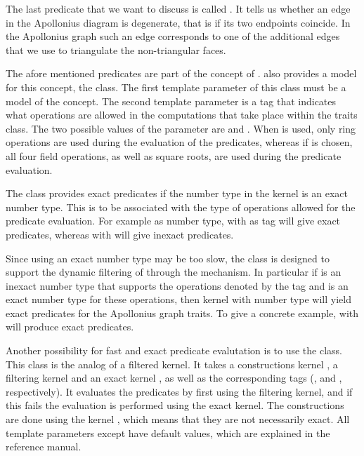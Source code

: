 The last predicate that we want to discuss is called
. It tells us whether an edge in the
Apollonius diagram is degenerate, that is if its two endpoints
coincide. In the Apollonius graph such an edge corresponds to one of
the additional edges that we use to triangulate the non-triangular
faces.

The afore mentioned predicates are part of the
 concept of \cgal. \cgal{} also provides
a model for this concept, the
 class. The first
template parameter of this class must be a model of the 
concept. The second template parameter is a tag that indicates what
operations are allowed in the computations that take place within the
traits class.
The two possible values of the  parameter are
 and . When
 is used, only ring operations are used during the
evaluation of the predicates, whereas if  is
chosen, all four field operations, as well as square roots, are used
during the predicate evaluation.

The  class provides exact
predicates if the number type in the kernel  is an exact number
type. This is to be associated with the type of operations allowed for
the predicate evaluation. For example  as number
type, with  as tag will give exact predicates,
whereas  with  will give
inexact predicates.

Since using an exact number type may be too slow, the
 class is designed to
support the dynamic filtering of \cgal{} through the
 mechanism. In particular if 
is an inexact number type that supports the operations denoted by the
tag  and  is an exact number type for these
operations, then kernel with number type
 will yield exact predicates for the
Apollonius graph traits. To give a concrete example,
 with 
 will produce exact predicates.

Another possibility for fast and exact predicate evalutation is to use
the
class. This class is the analog of a filtered kernel. It takes a
constructions kernel , a filtering kernel  and an
exact kernel , as well as the corresponding tags
(,  and , respectively).
It evaluates the predicates by first using the filtering kernel, and
if this fails the evaluation is performed using the exact kernel. The
constructions are done using the kernel , which means that
they are not necessarily exact. All template parameters except
 have default values, which are explained in the reference
manual.



